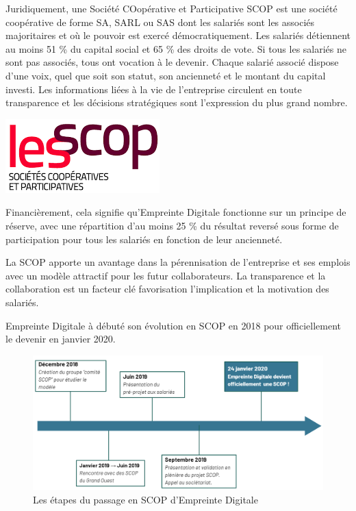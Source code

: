 \documentclass[12pt, a4paper, twoside]{article}
\begin{document}
\noindent%
\begin{minipage}{.7\textwidth}%
Juridiquement, une Société COopérative et Participative \gls{SCOP}  est une société coopérative de forme \gls{SA}, \gls{SARL} ou \gls{SAS} dont les salariés sont les associés majoritaires et où le pouvoir est exercé démocratiquement.
Les salariés détiennent au moins 51 \% du capital social et 65 \% des droits de vote. 
Si tous les salariés ne sont pas associés, tous ont vocation à le devenir. 
Chaque salarié associé dispose d’une voix, quel que soit son statut, son ancienneté et le montant du capital investi.
Les informations liées à la vie de l’entreprise circulent en toute transparence et les décisions stratégiques sont l’expression du plus grand nombre. \cite{Scop} \\
\end{minipage}%
\hfill
\begin{minipage}{.3\textwidth}%
\begin{center}
    \includegraphics[scale=0.7]{src/logo_scop.png}
\end{center}
\end{minipage}%

Financièrement, cela signifie qu'Empreinte Digitale fonctionne sur un principe de réserve, avec une répartition d'au moins 25 \% du résultat reversé sous forme de participation pour tous les salariés en fonction de leur ancienneté.

La \gls{SCOP} apporte un avantage dans la pérennisation de l'entreprise et ses emplois avec un modèle attractif pour les futur collaborateurs. 
La transparence et la collaboration est un facteur clé favorisation l'implication et la motivation des salariés.

Empreinte Digitale à débuté son évolution en \gls{SCOP} en 2018 pour officiellement le devenir en janvier 2020.
\begin{figure}[!ht]
    \centering
    \includegraphics[width=\textwidth]{src/graph_scop.png}
    \caption{Les étapes du passage en \gls{SCOP} d'Empreinte Digitale}
    \label{fig:transition_scop}
\end{figure}
\end{document}
